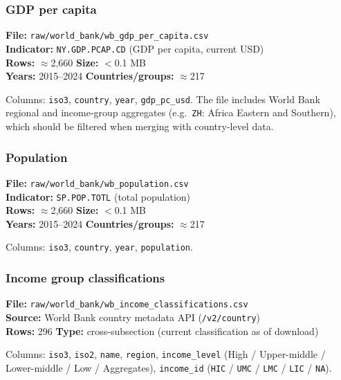 \documentclass[11pt,a4paper]{article}
\begin{document}
\subsubsection{GDP per capita}

\textbf{File:} \texttt{raw/world\_bank/wb\_gdp\_per\_capita.csv}\\
\textbf{Indicator:} \texttt{NY.GDP.PCAP.CD} (GDP per capita, current USD)\\
\textbf{Rows:} $\approx$2{,}660 \quad \textbf{Size:} $<$0.1 MB\\
\textbf{Years:} 2015--2024 \quad \textbf{Countries/groups:} $\approx$217

\noindent Columns: \texttt{iso3}, \texttt{country}, \texttt{year}, \texttt{gdp\_pc\_usd}.  The file includes World Bank regional and income-group aggregates (e.g.\ \texttt{ZH}: Africa Eastern and Southern), which should be filtered when merging with country-level data.

\subsubsection{Population}

\textbf{File:} \texttt{raw/world\_bank/wb\_population.csv}\\
\textbf{Indicator:} \texttt{SP.POP.TOTL} (total population)\\
\textbf{Rows:} $\approx$2{,}660 \quad \textbf{Size:} $<$0.1 MB\\
\textbf{Years:} 2015--2024 \quad \textbf{Countries/groups:} $\approx$217

\noindent Columns: \texttt{iso3}, \texttt{country}, \texttt{year}, \texttt{population}.

\subsubsection{Income group classifications}

\textbf{File:} \texttt{raw/world\_bank/wb\_income\_classifications.csv}\\
\textbf{Source:} World Bank country metadata API (\texttt{/v2/country})\\
\textbf{Rows:} 296 \quad \textbf{Type:} cross-subsection (current classification as of download)

\noindent Columns: \texttt{iso3}, \texttt{iso2}, \texttt{name}, \texttt{region}, \texttt{income\_level} (High / Upper-middle / Lower-middle / Low / Aggregates), \texttt{income\_id} (\texttt{HIC} / \texttt{UMC} / \texttt{LMC} / \texttt{LIC} / \texttt{NA}).
\end{document}
